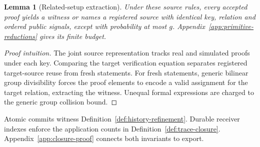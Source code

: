 \documentclass[conference,compsoc]{IEEEtran}
\theoremstyle{definition}
\numberwithin{equation}{section}
\numberwithin{table}{section}
\numberwithin{figure}{section}
\theoremstyle{plain}
\newtheorem{lemma}{Lemma}[section]
\newtheorem{lemma}{Lemma}
\begin{document}
\begin{lemma}[Related-setup extraction]
\label{lem:related-crs-extraction}
Under these source rules, every accepted proof yields a witness or names a
registered source with identical key, relation and ordered public signals,
except with probability at most \(g\).
Appendix~\ref{app:primitive-reductions} gives its finite budget.
\end{lemma}
\begin{proof}[Proof intuition]
The joint source representation tracks real and simulated proofs under
each key. Comparing the target verification equation separates registered
target-source reuse from fresh statements. For fresh statements, generic bilinear group
divisibility forces the proof elements to encode a valid assignment for the target relation,
extracting the witness. Unequal formal expressions are charged to the generic group collision bound.
\end{proof}

\label{lem:main-boundary-composition}
Atomic commits witness Definition~\ref{def:history-refinement}.
Durable receiver indexes enforce the application counts in
Definition~\ref{def:trace-closure}. Appendix~\ref{app:closure-proof}
connects both invariants to export.
\end{document}
